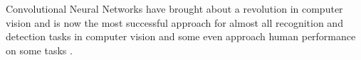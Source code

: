 			
Convolutional Neural Networks have brought about a revolution in computer 
vision and is now the most successful approach for almost all recognition and 
detection tasks in computer vision 
\cite{krizhevsky2012imagenet,tompson2014efficient,taigman2014deepface} 
and some even approach human performance on some tasks 
\cite{ciresan2012multi}.\\

% 
% 
